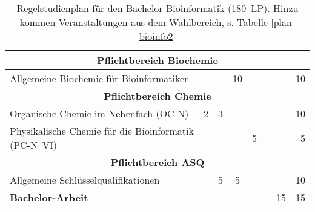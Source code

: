 \begin{table}[tbp]
\begin{small}
\begin{tabularx}{\textwidth}{|X||c|c|c|c|c|c||r|}
			\multicolumn{8}{|c|}{\textbf{Pflichtbereich Biochemie}}                                                                                         \\ \hline
			Allgemeine Biochemie für Bioinformatiker                                 &    &    & 10 &    &    &                               &          10 \\ \hline\hline
			\multicolumn{8}{|c|}{\textbf{Pflichtbereich Chemie}}                                                                                            \\ \hline
			Organische Chemie im Nebenfach (OC-N)                                    & 2  & 3  &    &    &    &                               &          10 \\ \hline
			Physikalische Chemie für die Bioinformatik (PC-N~VI)                     &    &    &    & 5  &    &                               &           5 \\ \hline\hline
			\multicolumn{8}{|c|}{\textbf{Pflichtbereich ASQ}}                                                                                               \\ \hline
			Allgemeine Schlüsselqualifikationen                                      &    & 5  & 5  &    &    &                               &          10 \\ \hline\hline
			\textbf{Bachelor-Arbeit}                                                 &    &    &    &    &    &              15               &          15 \\ \hline
		\end{tabularx}
	\end{small}
	\caption{Regelstudienplan für den Bachelor Bioinformatik (180~LP). Hinzu kommen Veranstaltungen aus dem Wahlbereich, s. Tabelle \ref{plan-bioinfo2} \label{plan-bioinfo}}
\end{table}

